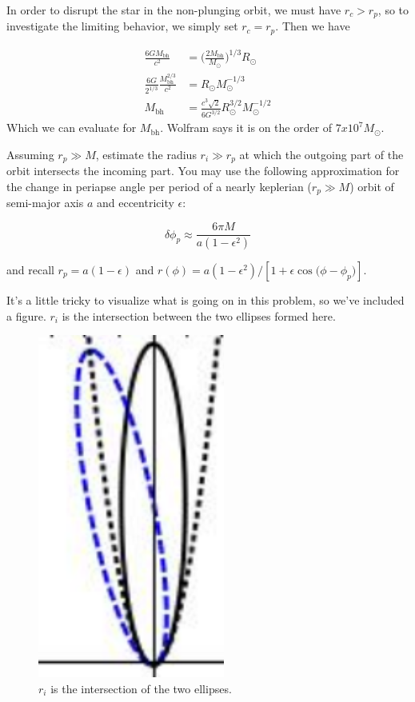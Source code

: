 \documentclass[11pt,largemargins]{homework}
\begin{document}
\begin{alphaparts}
In order to disrupt the star in the non-plunging orbit, we must have $r_{c} > r_{p}$, so to investigate the limiting behavior, we simply set $r_{c} = r_{p}$.  Then we have

\begin{subequations}
\begin{align}
\frac{6 G M_\mathrm{bh}}{c^2} &= \bigg(\frac{2 M_\mathrm{bh}}{M_{\odot}} \bigg) ^ {1/3} R_{\odot} \\
\frac{6G}{2^{1/3}} \frac{M_{\mathrm{bh}}^{2/3}}{c^2} &= R_{\odot} M_{\odot}^{-1/3} \\
M_{\mathrm{bh}} &= \frac{c^3 \sqrt{2}}{6 G^{3/2}} R_{\odot}^{3/2} M_{\odot}^{-1/2}
\end{align}
\end{subequations}
Which we can evaluate for $M_{\mathrm{bh}}$.  Wolfram says it is on the order of $7 x 10^{7} M_{\odot}$.  

\questionpart

Assuming $r_p \gg M$, estimate the radius $r_i \gg r_p$ at which the outgoing part of the orbit intersects the incoming part.  You may use the following approximation for the change in periapse angle per period of a nearly keplerian ($r_p \gg M$) orbit of semi-major axis $a$ and eccentricity $\epsilon:$

\begin{equation}
\delta \phi_{p} \approx \frac{6 \pi M}{a(1 - \epsilon^2)}
\end{equation}

and recall $r_{p} = a(1 - \epsilon)$ and $r(\phi) = a(1 - \epsilon^2) / [1 + \epsilon \cos{(\phi - \phi_{p}})]$.

It's a little tricky to visualize what is going on in this problem, so we've included a figure.  $r_i$ is the intersection between the two ellipses formed here. 
\begin{figure}[h]
\centering
\includegraphics[scale=0.6]{orbits}
\caption{$r_{i}$ is the intersection of the two ellipses.}
\end{figure}


\end{alphaparts}
\end{document}

